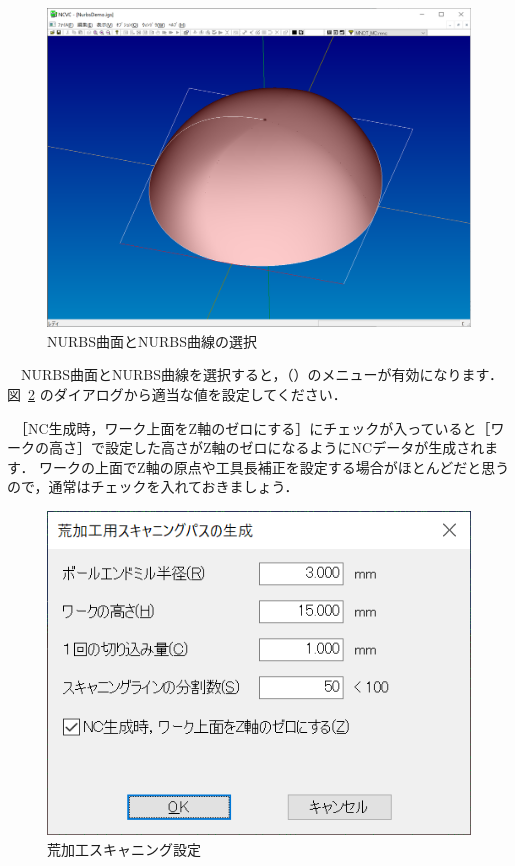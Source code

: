 \begin{figure}[H]
\centering
\includegraphics[scale=0.5]{No2/fig/fig22.png}
\caption{NURBS曲面とNURBS曲線の選択}
\label{fig:ncvc22}
\end{figure}

　NURBS曲面とNURBS曲線を選択すると，（）のメニューが有効になります．
図~\ref{fig:ncvc23} のダイアログから適当な値を設定してください．

　［NC生成時，ワーク上面をZ軸のゼロにする］にチェックが入っていると［ワークの高さ］で設定した高さがZ軸のゼロになるようにNCデータが生成されます．
ワークの上面でZ軸の原点や工具長補正を設定する場合がほとんどだと思うので，通常はチェックを入れておきましょう．

\begin{figure}[H]
\centering
\includegraphics{No2/fig/fig23.png}
\caption{荒加工スキャニング設定}
\label{fig:ncvc23}
\end{figure}


